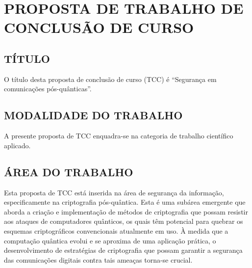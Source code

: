 
\chapter{PROPOSTA DE TRABALHO DE CONCLUSÃO DE CURSO}
\label{chap:proposta}

\section{TÍTULO}
\label{sec:titulo}

O título desta proposta de conclusão de curso (TCC) é ``Segurança em comunicações pós-quânticas''.

\section{MODALIDADE DO TRABALHO}
\label{sec:modalidade}

A presente proposta de TCC enquadra-se na categoria de trabalho científico aplicado.


\section{ÁREA DO TRABALHO}
\label{sec:area}

Esta proposta de TCC está inserida na área de segurança da informação, especificamente na criptografia pós-quântica. Esta é uma subárea emergente que aborda a criação e implementação de métodos de criptografia que possam resistir aos ataques de computadores quânticos, os quais têm potencial para quebrar os esquemas criptográficos convencionais atualmente em uso. À medida que a computação quântica evolui e se aproxima de uma aplicação prática, o desenvolvimento de estratégias de criptografia que possam garantir a segurança das comunicações digitais contra tais ameaças torna-se crucial. 

